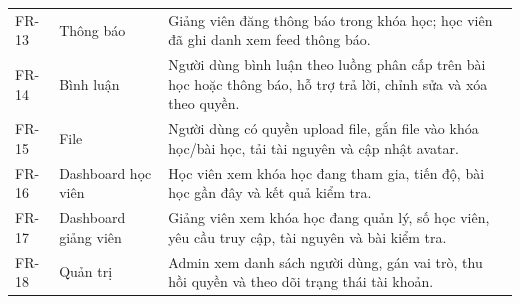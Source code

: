 \documentclass[12pt,a4paper]{report}
\begin{document}
\begin{longtable}{L{1.4cm} L{3cm} L{9cm}}
FR-13 & Thông báo & Giảng viên đăng thông báo trong khóa học; học viên đã ghi danh xem feed thông báo. \\
FR-14 & Bình luận & Người dùng bình luận theo luồng phân cấp trên bài học hoặc thông báo, hỗ trợ trả lời, chỉnh sửa và xóa theo quyền. \\
FR-15 & File & Người dùng có quyền upload file, gắn file vào khóa học/bài học, tải tài nguyên và cập nhật avatar. \\
FR-16 & Dashboard học viên & Học viên xem khóa học đang tham gia, tiến độ, bài học gần đây và kết quả kiểm tra. \\
FR-17 & Dashboard giảng viên & Giảng viên xem khóa học đang quản lý, số học viên, yêu cầu truy cập, tài nguyên và bài kiểm tra. \\
FR-18 & Quản trị & Admin xem danh sách người dùng, gán vai trò, thu hồi quyền và theo dõi trạng thái tài khoản. \\
\bottomrule
\end{longtable}
\end{document}
